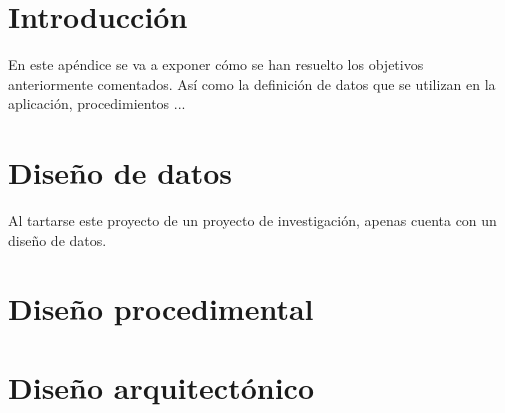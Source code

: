 
\section{Introducción}
En este apéndice se va a exponer cómo se han resuelto los objetivos anteriormente comentados. Así como la definición de datos que se utilizan en la aplicación, procedimientos ...

\section{Diseño de datos}
Al tartarse este proyecto de un proyecto de investigación, apenas cuenta con un diseño de datos.
\section{Diseño procedimental}

\section{Diseño arquitectónico}



